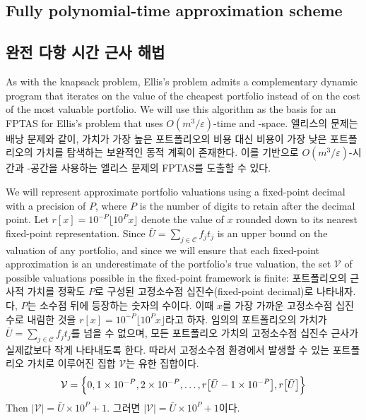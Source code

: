 \documentclass[11pt]{article} %
\theoremstyle{definition}
\theoremstyle{definition}
\begin{document}
\ifen \subsection{Fully polynomial-time approximation scheme}\else \subsection{완전 다항 시간 근사 해법}\fi \label{fptashead}
\ifen 
As with the knapsack problem, Ellis's problem admits a complementary dynamic program that iterates on the value of the cheapest portfolio instead of on the cost of the most valuable portfolio. We will use this algorithm as the basis for an FPTAS for Ellis's problem that uses $O(m^3 / \varepsilon)$-time and -space.%
\else
엘리스의 문제는 배낭 문제와 같이, 가치가 가장 높은 포트폴리오의 비용 대신 비용이 가장 낮은 포트폴리오의 가치를 탐색하는 보완적인 동적 계획이 존재한다. 이를 기반으로  $O(m^3 / \varepsilon)$-시간과 -공간을 사용하는 엘리스 문제의 FPTAS를 도출할 수 있다.%
\fi


\ifen 
We will represent approximate portfolio valuations using a fixed-point decimal with a precision of $P$, where $P$ is the number of digits to retain after the decimal point. Let $r[x] =  10^{-P}\lfloor 10^P x \rfloor$ denote the value of $x$ rounded down to its nearest fixed-point representation. Since $\bar U = \sum_{j\in \mathcal{C}} f_j t_j$ is an upper bound on the valuation of any portfolio, and since we will ensure that each fixed-point approximation is an underestimate of the portfolio's true valuation, the set $\mathcal{V}$ of possible valuations possible in the fixed-point framework is finite:
\else
포트폴리오의 근사적 가치를 정확도 $P$로 구성된 고정소수점 십진수(fixed-point decimal)로 나타내자. 다, $P$는 소수점 뒤에 등장하는 숫자의 수이다. 이때 $x$를 가장 가까운 고정소수점 십진수로 내림한 것을 $r[x] =  10^{-P}\lfloor 10^P x \rfloor$라고 하자. 임의의 포트폴리오의 가치가 $\bar U = \sum_{j\in \mathcal{C}} f_j t_j$를 넘을 수 없으며, 모든 포트폴리오 가치의 고정소수점 십진수 근사가 실제값보다 작게 나타내도록 한다. 따라서 고정소수점 환경에서 발생할 수 있는 포트폴리오 가치로 이루어진 집합 $\mathcal{V}$는 유한 집합이다.
\fi
\begin{equation}
\mathcal{V} = \Bigl\{0, 1\times 10^{-P}, 2\times 10^{-P}, \dots, r\bigl[\bar U- 1\times 10^{-P}\bigr], r\bigl[\bar U\bigr]\Bigr\}
\end{equation}
\ifen Then $|\mathcal{V} | = \bar U \times 10^P + 1$.
\else 그러면 $|\mathcal{V} | = \bar U \times 10^P + 1$이다.\fi
\end{document}

